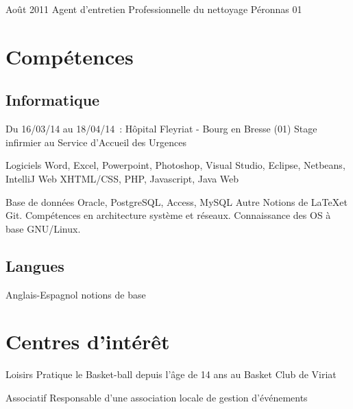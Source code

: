 \documentclass[10pt,a4paper]{moderncv}
\begin{document}
\cventry
	{Août 2011}
	{Agent d'entretien}
	{Professionnelle du nettoyage}
	{Péronnas}
	{01}
	{}


\section{Compétences}

\subsection{Informatique}

\cvcomputer
	{Du 16/03/14 au 18/04/14 : Hôpital Fleyriat - Bourg en Bresse (01)}
	{Stage infirmier au Service d’Accueil des Urgences}
	{}
	{}

\cvcomputer
	{Logiciels}
	{Word, Excel, Powerpoint, Photoshop, Visual Studio, Eclipse, Netbeans, IntelliJ}
	{Web}
	{XHTML/CSS, PHP, Javascript, Java Web}

\cvcomputer
	{Base de données}
	{Oracle, PostgreSQL, Access, MySQL}
	{Autre}
	{Notions de \LaTeX et Git. Compétences en architecture système et réseaux. Connaissance des OS à base GNU/Linux.}

\subsection{Langues}


\cvlanguage
	{Anglais-Espagnol}
	{notions de base}
	{}



\section{Centres d'intérêt}

\cvline
	{Loisirs}
	{Pratique le Basket-ball depuis l'âge de 14 ans au Basket Club de Viriat}

\cvline
	{Associatif}
	{Responsable d'une association locale de gestion d'événements}

\end{document}
